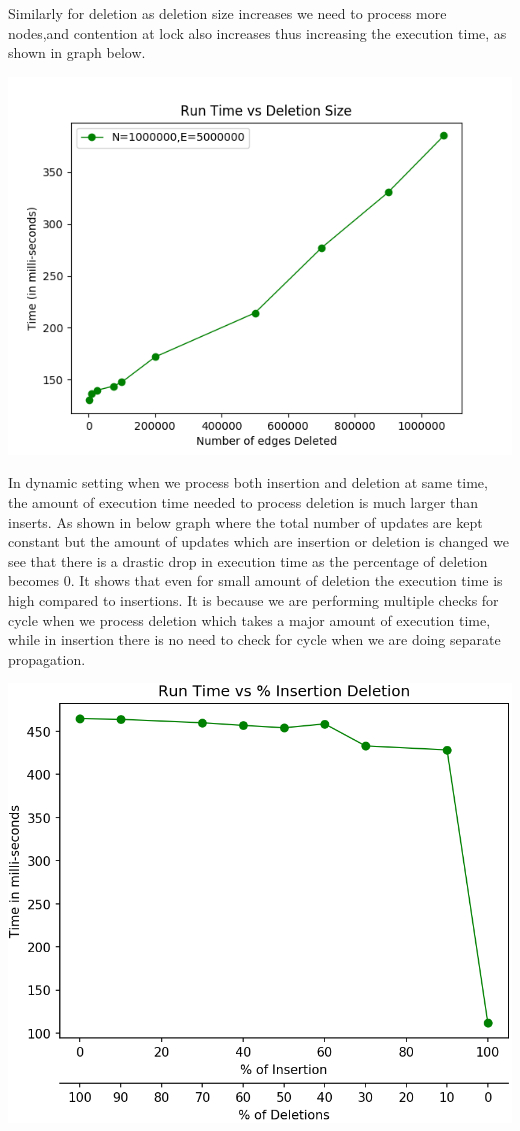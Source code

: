 \documentclass[a4paper]{article}
\begin{document}
Similarly for deletion as deletion size increases we need to process more nodes,and contention at lock also increases thus increasing the execution time, as shown in graph below.
\begin{center}
\includegraphics[scale=0.45]{img/DvT.png}        
\end{center}
In dynamic setting when we process both insertion and deletion at same time, the amount of execution time needed to process deletion is much larger than inserts. As shown in below graph where the total number of updates are kept constant but the amount of updates which are insertion or deletion is changed we see that there is a drastic drop in execution time as the percentage of deletion becomes 0. It shows that even for small amount of deletion the execution time is high compared to insertions. It is because we are performing multiple checks for cycle when we process deletion which takes a major amount of execution time, while in insertion there is no need to check for cycle when we are doing separate propagation.\\
\begin{center}
\includegraphics[scale=0.45]{img/IDvK.png}        
\end{center}
\end{document}
